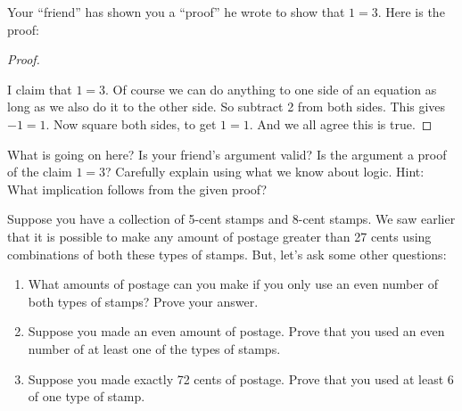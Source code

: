 \documentclass[10pt,]{book}
\theoremstyle{plain}
\theoremstyle{definition}
\theoremstyle{definition}
\theoremstyle{definition}
\theoremstyle{definition}
\numberwithin{equation}{chapter}
\begin{document}
\begin{divisionexercise}{3}\hypertarget{exercise-238}{}
\hypertarget{p-2025}{}%
Your ``friend'' has shown you a ``proof'' he wrote to show that \(1 = 3\). Here is the proof:%
\begin{proof}\hypertarget{proof-31}{}
\hypertarget{p-2026}{}%
I claim that \(1 = 3\). Of course we can do anything to one side of an equation as long as we also do it to the other side. So subtract 2 from both sides. This gives \(-1 = 1\). Now square both sides, to get \(1 = 1\). And we all agree this is true.%
\end{proof}
\hypertarget{p-2027}{}%
What is going on here? Is your friend's argument valid? Is the argument a proof of the claim \(1=3\)? Carefully explain using what we know about logic. Hint: What implication follows from the given proof?%
\end{divisionexercise}%
\begin{divisionexercise}{4}\hypertarget{exercise-239}{}
\hypertarget{p-2028}{}%
Suppose you have a collection of 5-cent stamps and 8-cent stamps. We saw earlier that it is possible to make any amount of postage greater than 27 cents using combinations of both these types of stamps. But, let's ask some other questions: \leavevmode%
\begin{enumerate}[label=(\alph*)]
\item\hypertarget{li-702}{}\hypertarget{p-2029}{}%
What amounts of postage can you make if you only use an even number of both types of stamps? Prove your answer.%
\item\hypertarget{li-703}{}\hypertarget{p-2030}{}%
Suppose you made an even amount of postage. Prove that you used an even number of at least one of the types of stamps.%
\item\hypertarget{li-704}{}\hypertarget{p-2031}{}%
Suppose you made exactly 72 cents of postage. Prove that you used at least 6 of one type of stamp.%
\end{enumerate}
%
\end{divisionexercise}%
\end{document}
